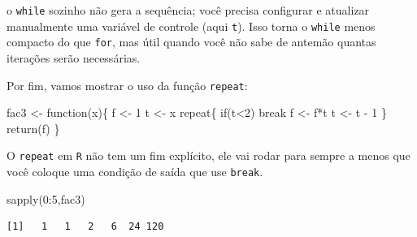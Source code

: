 \documentclass[
  letterpaper,
  DIV=11,
  numbers=noendperiod]{scrreprt}
\newenvironment{Shaded}{\begin{snugshade}}{\end{snugshade}}
\newcommand{\ControlFlowTok}[1]{\textcolor[rgb]{0.00,0.23,0.31}{#1}}
\newcommand{\DecValTok}[1]{\textcolor[rgb]{0.68,0.00,0.00}{#1}}
\newcommand{\FunctionTok}[1]{\textcolor[rgb]{0.28,0.35,0.67}{#1}}
\newcommand{\NormalTok}[1]{\textcolor[rgb]{0.00,0.23,0.31}{#1}}
\newcommand{\OtherTok}[1]{\textcolor[rgb]{0.00,0.23,0.31}{#1}}
\newcommand{\SpecialCharTok}[1]{\textcolor[rgb]{0.37,0.37,0.37}{#1}}
\begin{document}
\begin{tcolorbox}[enhanced jigsaw, left=2mm, toprule=.15mm, opacityback=0, title=\textcolor{quarto-callout-warning-color}{\faExclamationTriangle}\hspace{0.5em}{O ponto central}, leftrule=.75mm, breakable, colbacktitle=quarto-callout-warning-color!10!white, coltitle=black, rightrule=.15mm, bottomtitle=1mm, toptitle=1mm, colframe=quarto-callout-warning-color-frame, colback=white, opacitybacktitle=0.6, bottomrule=.15mm, arc=.35mm, titlerule=0mm]

o \texttt{while} sozinho não gera a sequência; você precisa configurar e
atualizar manualmente uma variável de controle (aqui \texttt{t}). Isso
torna o \texttt{while} menos compacto do que \texttt{for}, mas útil
quando você não sabe de antemão quantas iterações serão necessárias.

\end{tcolorbox}

Por fim, vamos mostrar o uso da função \texttt{repeat}:

\begin{Shaded}
\begin{Highlighting}[]
\NormalTok{fac3 }\OtherTok{\textless{}{-}} \ControlFlowTok{function}\NormalTok{(x)\{}
\NormalTok{  f }\OtherTok{\textless{}{-}} \DecValTok{1}
\NormalTok{  t }\OtherTok{\textless{}{-}}\NormalTok{ x}
  \ControlFlowTok{repeat}\NormalTok{\{}
    \ControlFlowTok{if}\NormalTok{(t}\SpecialCharTok{\textless{}}\DecValTok{2}\NormalTok{) }\ControlFlowTok{break}
\NormalTok{    f }\OtherTok{\textless{}{-}}\NormalTok{ f}\SpecialCharTok{*}\NormalTok{t}
\NormalTok{    t }\OtherTok{\textless{}{-}}\NormalTok{ t }\SpecialCharTok{{-}} \DecValTok{1}
\NormalTok{  \}}
  \FunctionTok{return}\NormalTok{(f)}
\NormalTok{\}}
\end{Highlighting}
\end{Shaded}

O \texttt{repeat} em \texttt{R} não tem um fim explícito, ele vai rodar
para sempre a menos que você coloque uma condição de saída que use
\texttt{break}.

\begin{Shaded}
\begin{Highlighting}[]
\FunctionTok{sapply}\NormalTok{(}\DecValTok{0}\SpecialCharTok{:}\DecValTok{5}\NormalTok{,fac3)}
\end{Highlighting}
\end{Shaded}

\begin{verbatim}
[1]   1   1   2   6  24 120
\end{verbatim}
\end{document}
